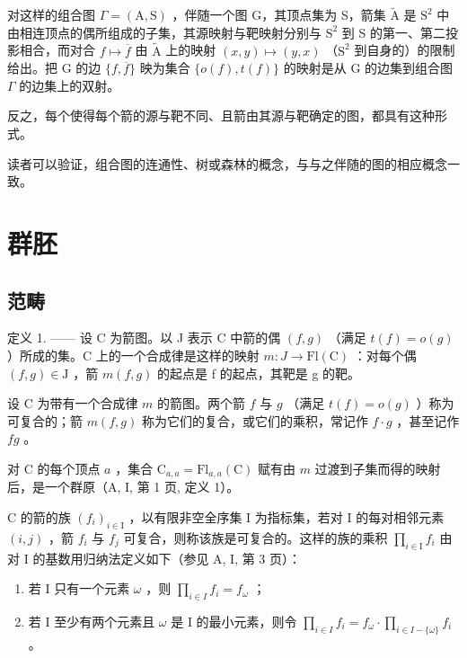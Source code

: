 对这样的组合图 \(\Gamma = (\mathrm{A},\mathrm{S})\) ，伴随一个图 G，其顶点集为 S，箭集 \(\widetilde{\mathrm{A}}\) 是 \(\mathrm{S}^2\) 中由相连顶点的偶所组成的子集，其源映射与靶映射分别与 \(\mathrm{S}^2\) 到 S 的第一、第二投影相合，而对合 \(f\mapsto \overline{f}\) 由 \(\widetilde{\mathrm{A}}\) 上的映射 \((x,y)\mapsto (y,x)\) （\(\mathrm{S}^2\) 到自身的）的限制给出。把 G 的边 \(\{f,\overline{f}\}\) 映为集合 \(\{o(f),t(f)\}\) 的映射是从 G 的边集到组合图 \(\Gamma\) 的边集上的双射。

反之，每个使得每个箭的源与靶不同、且箭由其源与靶确定的图，都具有这种形式。

读者可以验证，组合图的连通性、树或森林的概念，与与之伴随的图的相应概念一致。

\section{群胚}

\subsection{范畴}

定义 1. —— 设 C 为箭图。以 J 表示 C 中箭的偶 \((f,g)\) （满足 \(t(f)=o(g)\) ）所成的集。C 上的一个合成律是这样的映射 \(m:J\to\mathrm{Fl}(\mathrm{C})\) ：对每个偶 \((f,g)\in\mathrm{J}\) ，箭 \(m(f,g)\) 的起点是 f 的起点，其靶是 g 的靶。

设 C 为带有一个合成律 \(m\) 的箭图。两个箭 \(f\) 与 \(g\) （满足 \(t(f) = o(g)\) ）称为可复合的；箭 \(m(f, g)\) 称为它们的复合，或它们的乘积，常记作 \(f \cdot g\) ，甚至记作 \(fg\) 。

对 C 的每个顶点 \(a\) ，集合 \(\mathrm{C}_{a,a} = \mathrm{Fl}_{a,a}(\mathrm{C})\) 赋有由 \(m\) 过渡到子集而得的映射后，是一个群原（A, I, 第 1 页, 定义 1）。

C 的箭的族 \((f_{i})_{i\in\mathrm{I}}\) ，以有限非空全序集 I 为指标集，若对 I 的每对相邻元素 \((i,j)\) ，箭 \(f_{i}\) 与 \(f_{j}\) 可复合，则称该族是可复合的。这样的族的乘积 \(\prod_{i\in\mathrm{I}}f_{i}\) 由对 I 的基数用归纳法定义如下（参见 A, I, 第 3 页）：

\begin{enumerate}
\def\labelenumi{(\roman{enumi})}
\item
  若 I 只有一个元素 \(\omega\) ，则 \(\prod_{i\in I}f_i = f_\omega\) ；
\item
  若 I 至少有两个元素且 \(\omega\) 是 I 的最小元素，则令 \(\prod_{i\in I}f_i = f_\omega \cdot \prod_{i\in I - \{\omega \}}f_i\) 。
\end{enumerate}

